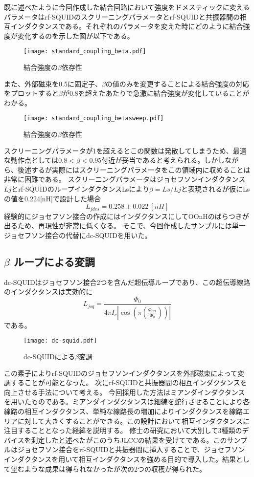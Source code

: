         既に述べたように今回作成した結合回路において強度をドメスティックに変えるパラメータはrf-SQUIDのスクリーニングパラメータとrf-SQUIDと共振器間の相互インダクタンスである。それぞれのパラメータを変えた時にどのように結合強度が変化するのを示した図が以下である。
        \begin{figure}[H]
            \centering
            \texttt{[image: standard\_coupling\_beta.pdf]}
            \caption{結合強度の$\beta$依存性}
        \end{figure}
        また、外部磁束を0.5に固定子、$\beta$の値のみを変更することによる結合強度の対応をプロットすると$\beta$が0.8を超えたあたりで急激に結合強度が変化していることがわかる。
        \begin{figure}[H]
            \centering
            \texttt{[image: standard\_coupling\_betasweep.pdf]}
            \caption{結合強度の$\beta$依存性}
        \end{figure}
        スクリーニングパラメータが1を超えるとこの関数は発散してしまうため、最適な動作点としては$0.8<\beta<0.95$付近が妥当であると考えられる。しかしながら、後述するが実際にはスクリーニングパラメータをこの領域内に収めることは非常に困難である。
        スクリーニングパラメータはジョセフソンインダクタンス$Lj$とrf-SQUIDのループインダクタンスLsにより$\beta=Ls/Lj$と表現されるが仮にLsの値を0.224[nH]で設計した場合
        \begin{equation*}
            L_{jdes} = 0.258 \pm 0.022\ [nH]
        \end{equation*}
        経験的にジョセフソン接合の作成にはインダクタンスにしてOOnHのばらつきが出るため、再現性が非常に低くなる。
        そこで、今回作成したサンプルには単一ジョセフソン接合の代替にdc-SQUIDを用いた。
        \subsection{$\beta$ ループによる変調}
        dc-SQUIDはジョセフソン接合2つを含んだ超伝導ループであり、この超伝導線路のインダクタンスは実効的に
        \begin{equation*}
            L_{jsq} = \frac{\Phi_0}{4\pi I_c|\cos(\pi(\frac{\Phi_{ext}}{\Phi_0}))|}
        \end{equation*}
        である。
        \begin{figure}[H]
            \centering
            \texttt{[image: dc-squid.pdf]}
            \caption{dc-SQUIDによる$\beta$変調}
        \end{figure}
        この素子によりrf-SQUIDのジョセフソンインダクタンスを外部磁束によって変調することが可能となった。
        次にrf-SQUIDと共振器間の相互インダクタンスを向上させる手法について考える。
        今回採用した方法はミアンダインダクタンスを用いたものである。ミアンダインダクタンスは細線を蛇行させることにより各線路の相互インダクタンス、単純な線路長の増加によりインダクタンスを線路エリアに対して大きくすることができる。この設計において相互インダクタンスに注目することとなった経緯を説明する。
        修士の研究において大別して3種類のデバイスを測定したと述べたがこのうちJLCCの結果を受けてである。このサンプルはジョセフソン接合をrf-SQUIDと共振器間に挿入することで、ジョセフソンインダクタンスを用いて相互インダクタンスを強める目的で導入した。結果として望むような成果は得られなかったが次の2つの収穫が得られた。

